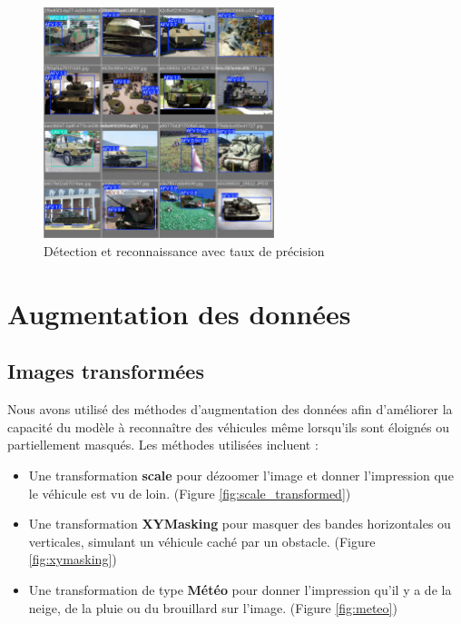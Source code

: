 \begin{figure}[H]
    \center
    \includegraphics[width=0.6\textwidth]{./images/track2_val.jpg}
    \caption[Détection et reconnaissance avec taux de précision]{Détection et reconnaissance avec taux de précision}\label{fig:track2_val}
\end{figure}


\section{Augmentation des données}

\subsection{Images transformées}

Nous avons utilisé des méthodes d'augmentation des données afin d'améliorer la capacité du modèle à reconnaître des véhicules même lorsqu'ils sont éloignés ou partiellement masqués. Les méthodes utilisées incluent :

\begin{itemize}
	\item Une transformation \textbf{scale} pour dézoomer l'image et donner l'impression que le véhicule est vu de loin. (Figure \ref{fig:scale_transformed})
	\item Une transformation \textbf{XYMasking} pour masquer des bandes horizontales ou verticales, simulant un véhicule caché par un obstacle. (Figure \ref{fig:xymasking})
	\item Une transformation de type \textbf{Météo} pour donner l'impression qu'il y a de la neige, de la pluie ou du brouillard sur l'image. (Figure \ref{fig:meteo})
\end{itemize}


